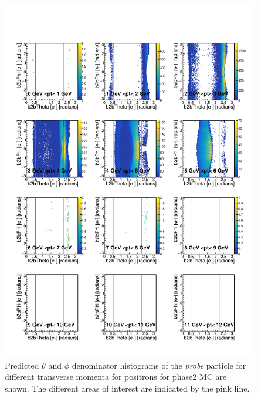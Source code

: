 \documentclass[a4paper,11pt,twosided,final,german,openbib,pdftex,listof=totoc,bibliography=totoc]{scrbook}
\begin{document}
\begin{appendix}
\begin{figure}[h!]
	\includegraphics[width=\textwidth]{Plots/RTPtMepD_MC.pdf}
	\caption[Denominator $\theta$, $\phi$ Positron Transverse Momentum MC]{Predicted $\theta$ and $\phi$ denominator histograms of the \textit{probe} particle for different transverse momenta for positrons for phase2 MC are shown. The different areas of interest are indicated by the pink line.}
	\label{plt:RTPtMepD_MC}
\end{figure}




\end{appendix}
\end{document}
